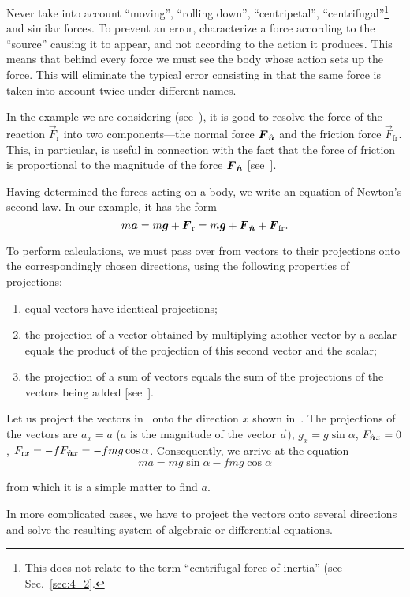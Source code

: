 Never take into account ``moving'', ``rolling down'', ``centripetal'', ``centrifugal''\footnote{This does not relate to the term ``centrifugal force of inertia'' (see Sec.~\ref{sec:4_2}.} and similar forces. To prevent an error, characterize a force according to the ``source'' causing it to appear, and not according to the action it produces. This means that behind every force we must see the body whose action sets up the force. This will eliminate the typical error consisting in that the same force is taken into account twice under different names.

In the example we are considering (see~), it is good to resolve the force of the reaction $\vec{F}_{\text{r}}$ into two components---the normal force $\boldsymbol{F}_{\hat{\boldsymbol{n}}}$ and the friction force $\vec{F}_{\text{fr}}$. This, in particular, is useful in connection with the fact that the force of friction is proportional to the magnitude of the force $\boldsymbol{F}_{\hat{\boldsymbol{n}}}$ [see~].

Having determined the forces acting on a body, we write an equation of Newton's second law. In our example, it has the form
\begin{equation}\label{eq:2_42}
m\boldsymbol{a} = m\boldsymbol{g} + \boldsymbol{F}_{\text{r}} = m\boldsymbol{g} + \boldsymbol{F}_{\hat{\boldsymbol{n}}} + \boldsymbol{F}_{\text{fr}}.
\end{equation}

\noindent
To perform calculations, we must pass over from vectors to their projections onto the correspondingly chosen directions, using the following properties of projections:
\begin{enumerate}[(1)]
	\item equal vectors have identical projections;
	\item the projection of a vector obtained by multiplying another vector by a scalar equals the product of the projection of this second vector and the scalar;
	\item the projection of a sum of vectors equals the sum of the projections of the vectors being added [see~].
\end{enumerate}

Let us project the vectors in~ onto the direction $x$ shown in~. The projections of the vectors are $a_x=a$ ($a$ is the magnitude of the vector $\vec{a}$), $g_x=g\sin\alpha$, $F_{\hat{\boldsymbol{n}}x}=0$, $F_{\text{r}x}=-f F_{\hat{\boldsymbol{n}}x}=-fmg\cos\alpha$. Consequently, we arrive at the equation
\begin{equation*}
ma = mg\sin\alpha - fmg\cos\alpha
\end{equation*}

\noindent
from which it is a simple matter to find $a$.

In more complicated cases, we have to project the vectors onto several directions and solve the resulting system of algebraic or differential equations.
